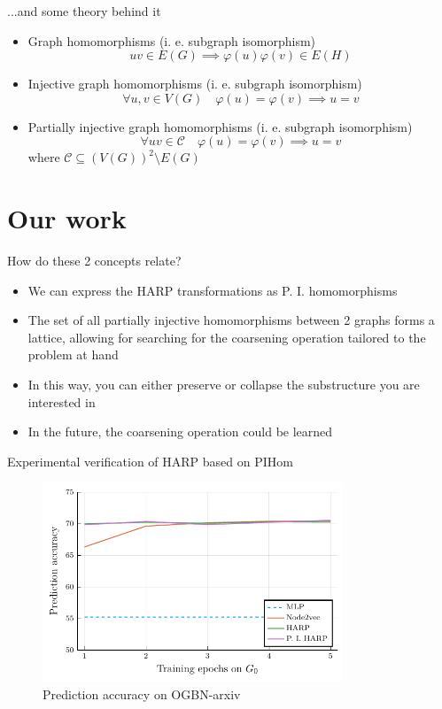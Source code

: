 \documentclass[10pt]{beamer}
\begin{document}
\begin{frame}{...and some theory behind it}
	\begin{itemize}
		\item Graph homomorphisms (i. e. subgraph isomorphism)
\[ uv \in E \left( G \right) \implies \varphi \left( u \right) \varphi \left( v \right) \in E \left( H \right) \]
		\item Injective graph homomorphisms (i. e. subgraph isomorphism)
\[ \forall u, v \in V \left( G \right) \quad \varphi \left( u \right) = \varphi \left( v \right) \implies u = v \]
		\item Partially injective graph homomorphisms (i. e. subgraph isomorphism)
\[ \forall uv \in \mathcal{C} \quad \varphi \left( u \right) = \varphi \left( v \right) \implies u = v \]
			where \( \mathcal{C} \subseteq \left( V \left( G \right) \right)^2 \setminus E \left( G \right) \)
	\end{itemize}
\end{frame}

\section{Our work}

\begin{frame}{How do these 2 concepts relate?}
	\begin{itemize}
		\item We can express the HARP transformations as P. I. homomorphisms
		\item The set of all partially injective homomorphisms between 2 graphs forms a lattice, allowing for searching for the coarsening operation tailored to the problem at hand
		\item In this way, you can either preserve or collapse the substructure you are interested in
		\item In the future, the coarsening operation could be learned
	\end{itemize}
\end{frame}

\begin{frame}{Experimental verification of HARP based on PIHom}
	\begin{figure}
		\centering
		\includegraphics[width=0.8\textwidth]{images/pihom_comparison/pihom_comparison.pdf}
		\caption{Prediction accuracy on OGBN-arxiv}
	\end{figure}
\end{frame}
\end{document}
